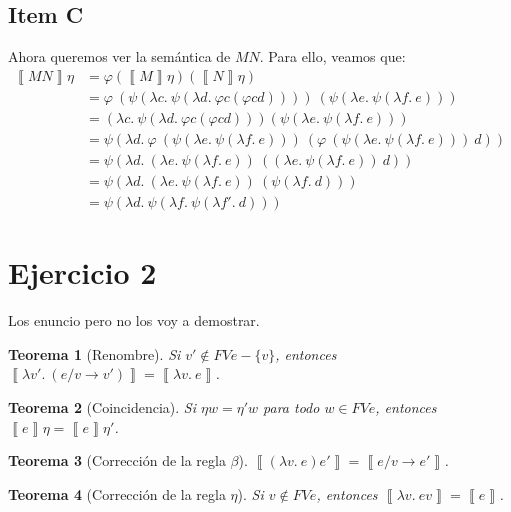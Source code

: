 \documentclass{article}
\newtheorem*{theorem*}{Teorema}
\newcommand{\sem}[1]{\left\llbracket #1\right\rrbracket}
\begin{document}
\subsection*{Item C}
Ahora queremos ver la semántica de $MN$.
Para ello, veamos que:
\begin{equation*}
  \begin{aligned}
    \sem{MN}\eta &= \varphi(\sem{M}\eta)(\sem{N}\eta) \\ 
                 &= \varphi\ (\psi(\lambda c.\ \psi(\lambda d.\ \varphi c (\varphi c d))))\ (\psi(\lambda e.\ \psi(\lambda f.\ e))) \\ 
                 &= (\lambda c.\ \psi(\lambda d.\ \varphi c (\varphi c d))) (\psi(\lambda e.\ \psi(\lambda f.\ e))) \\ 
                 &= \psi(\lambda d.\ \varphi\ (\psi(\lambda e.\ \psi(\lambda f.\ e)))\ (\varphi\ (\psi(\lambda e.\ \psi(\lambda f.\ e)))\ d)) \\ 
                 &= \psi(\lambda d.\ (\lambda e.\ \psi(\lambda f.\ e))\ ((\lambda e.\ \psi(\lambda f.\ e))\ d)) \\ 
                 &= \psi(\lambda d.\ (\lambda e.\ \psi(\lambda f.\ e))\ (\psi(\lambda f.\ d))) \\ 
                 &= \psi(\lambda d.\ \psi(\lambda f.\ \psi(\lambda f'.\ d)))
  \end{aligned}
\end{equation*}

\section*{Ejercicio 2}
Los enuncio pero no los voy a demostrar.

\begin{theorem*}[Renombre]
  Si $v' \notin FVe - \{v\}$, entonces $\sem{\lambda v'.\ (e / v \to v')} = \sem{\lambda v.\ e}$.
\end{theorem*}

\begin{theorem*}[Coincidencia]
  Si $\eta w = \eta' w$ para todo $w \in FVe$, entonces $\sem{e}\eta = \sem{e}\eta'$.
\end{theorem*}

\begin{theorem*}[Corrección de la regla $\beta$]
  $\sem{(\lambda v.\ e)e'} = \sem{e / v \to e'}$.
\end{theorem*}

\begin{theorem*}[Corrección de la regla $\eta$]
  Si $v \notin FVe$, entonces $\sem{\lambda v.\ ev} = \sem{e}$.
\end{theorem*}
\end{document}
